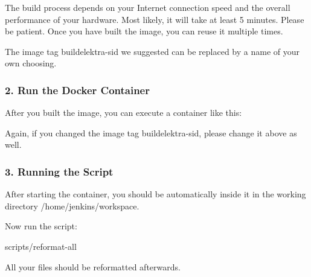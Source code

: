 The build process depends on your Internet connection speed and the overall performance of your hardware. Most likely, it will take at least 5 minutes. Please be patient. Once you have built the image, you can reuse it multiple times.

The image tag {\ttfamily buildelektra-\/sid} we suggested can be replaced by a name of your own choosing.

\subsubsection*{2. Run the Docker Container}

After you built the image, you can execute a container like this\+:




Again, if you changed the image tag {\ttfamily buildelektra-\/sid}, please change it above as well.

\subsubsection*{3. Running the Script}

After starting the container, you should be automatically inside it in the working directory {\ttfamily /home/jenkins/workspace}.

Now run the script\+:


\begin{DoxyCode}
scripts/reformat-all
\end{DoxyCode}


All your files should be reformatted afterwards. 